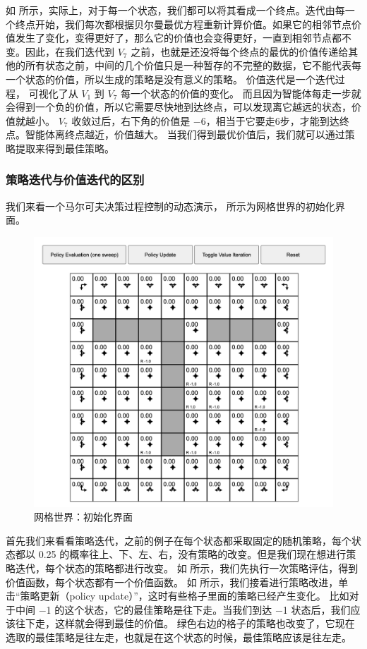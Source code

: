 如 所示，实际上，对于每一个状态，我们都可以将其看成一个终点。迭代由每一个终点开始，我们每次都根据贝尔曼最优方程重新计算价值。如果它的相邻节点价值发生了变化，变得更好了，那么它的价值也会变得更好，一直到相邻节点都不变。因此，在我们迭代到 $V_7$ 之前，也就是还没将每个终点的最优的价值传递给其他的所有状态之前，中间的几个价值只是一种暂存的不完整的数据，它不能代表每一个状态的价值，所以生成的策略是没有意义的策略。
价值迭代是一个迭代过程， 可视化了从  $V_1$ 到 $V_7$  每一个状态的价值的变化。
而且因为智能体每走一步就会得到一个负的价值，所以它需要尽快地到达终点，可以发现离它越远的状态，价值就越小。
$V_7$ 收敛过后，右下角的价值是 $-$6，相当于它要走6步，才能到达终点。智能体离终点越近，价值越大。
当我们得到最优价值后，我们就可以通过策略提取来得到最佳策略。

\subsubsection{策略迭代与价值迭代的区别} 
我们来看一个马尔可夫决策过程控制的动态演示， 所示为网格世界的初始化界面。

\begin{figure}[hbt]
  \centering
  \includegraphics[width=0.4\linewidth]{res/ch2/2.54}
  \caption{网格世界：初始化界面}
  \label{fig:fig2.54}
\end{figure}

首先我们来看看策略迭代，之前的例子在每个状态都采取固定的随机策略，每个状态都以 0.25 的概率往上、下、左、右，没有策略的改变。但是我们现在想进行策略迭代，每个状态的策略都进行改变。
如 所示，我们先执行一次策略评估，得到价值函数，每个状态都有一个价值函数。
如 所示，我们接着进行策略改进，单击“策略更新（policy update）”，这时有些格子里面的策略已经产生变化。
比如对于中间 $-$1 的这个状态，它的最佳策略是往下走。当我们到达 $-$1 状态后，我们应该往下走，这样就会得到最佳的价值。
绿色右边的格子的策略也改变了，它现在选取的最佳策略是往左走，也就是在这个状态的时候，最佳策略应该是往左走。

